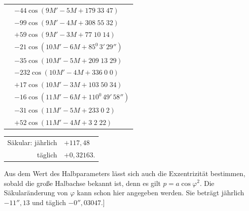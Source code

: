 \begin{landscape}
\begin{longtable}{@{}r@{}l@{}}
&\(-44\cos(9M'-5M+179\;33\;47)\)\\
&\(-99\cos(9M'-4M+308\;55\;32)\)\\
&\(+59\cos(9M'-3M+77\;10\;14)\)\\[3pt]
&\(-21\cos(10M'-6M+85^0\,3'\,29'')\)\\
&\(-35\cos(10M'-5M+209\;13\;29)\)\\
&\(-232\cos(10M'-4M+336\;0\;0)\)\\
&\(+17\cos(10M'-3M+103\;50\;34)\)\\[3pt]
&\(-16\cos(11M'-6M+110^0\,49'\,58'')\)\\
&\(-31\cos(11M'-5M+233\;0\;2)\)\\
&\(+52\cos(11M'-4M+3\;2\;22)\)
\end{longtable}
\begin{center}
\begin{tabular}{rl}
Säkular: jährlich&\(+117{,}48\)\\
täglich&\(+0{,}32163\).
\end{tabular}
\end{center}
\endgroup
\par\noindent\hspace*{\parindent}Aus dem Wert des Halbparameters lässt sich auch die Exzentrizität bestimmen, sobald die große Halbachse bekannt ist, denn es gilt \(p=a\cos\varphi^2\). Die Säkularänderung von \(\varphi\) kann schon hier angegeben werden. Sie beträgt jährlich \(-11''{,}13\) und täglich \(-0''{,}03047\).]
\clearpage
\endgroup
\end{landscape}
